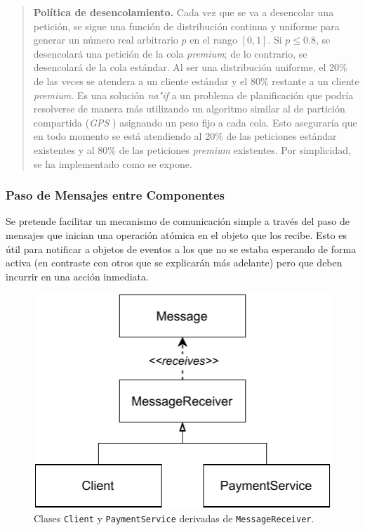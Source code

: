 \documentclass[a4paper]{article}
\begin{document}
	\begin{quotation}
		\textbf{Política de desencolamiento.} Cada vez que se va a desencolar una petición, se sigue una función de distribución continua y uniforme para generar un número real arbitrario $p$ en el rango $[0, 1]$. Si $p\leq0.8$, se desencolará una petición de la cola \textit{premium}; de lo contrario, se desencolará de la cola estándar. Al ser una distribución uniforme, el 20\% de las veces se atendera a un cliente estándar y el 80\% restante a un cliente \textit{premium}. Es una solución \textit{na"if} a un problema de planificación que podría resolverse de manera más utilizando un algoritmo similar al de partición compartida (\textit{GPS} \cite{gps}) asignando un peso fijo a cada cola. Esto aseguraría que en todo momento se está atendiendo al 20\% de las peticiones estándar existentes y al 80\% de las peticiones \textit{premium} existentes. Por simplicidad, se ha implementado como se expone.
	\end{quotation}
	
	\subsubsection*{Paso de Mensajes entre Componentes}
	Se pretende facilitar un mecanismo de comunicación simple a través del paso de mensajes que inician una operación atómica en el objeto que los recibe. Esto es útil para notificar a objetos de eventos a los que no se estaba esperando de forma activa (en contraste con otros que se explicarán más adelante) pero que deben incurrir en una acción inmediata.
	
	\begin{figure}[h]
		\centering
		\includegraphics[scale=0.8]{figures/message_receivers.pdf}
		\caption{Clases \texttt{Client} y \texttt{PaymentService} derivadas de \texttt{MessageReceiver}.}
	\end{figure}
	
\end{document}
